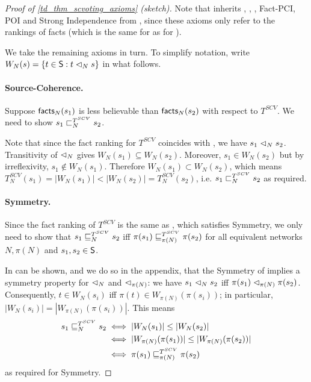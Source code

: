 \begin{proof}[Proof of \cref{td_thm_scvoting_axioms} (sketch)]

    Note that \scvoting{} inherits \unanimity{}, \groundedness{},
    \monotonicity{}, Fact-PCI,
POI and Strong Independence from \voting{}, since these axioms only refer to
the rankings of facts (which is the same for \scvoting{} as for \voting{}).

We take the remaining axioms in turn. To simplify notation, write $W_N(s) = \{t
\in \S : t \scoh_N s \}$ in what follows.

\paragraph{Source-Coherence.}

Suppose $\facts_N(s_1)$ is less believable than $\facts_N(s_2)$ with respect to
$T^{SCV}$. We need to show $s_1 \slt_N^{T^{SCV}} s_2$.

Note that since the fact ranking for $T^{SCV}$ coincides with \voting{}, we
have $s_1 \scoh_N s_2$. Transitivity of ${\scoh_N}$ gives $W_N(s_1) \subseteq
W_N(s_2)$. Moreover, $s_1 \in W_N(s_2)$ but by irreflexivity, $s_1 \notin
W_N(s_1)$. Therefore $W_N(s_1) \subset W_N(s_2)$, which means $T_N^{SCV}(s_1) =
|W_N(s_1)| < |W_N(s_2)| = T_N^{SCV}(s_2)$, i.e.  $s_1 \slt_N^{T^{SCV}} s_2$ as
required.

\paragraph{Symmetry.} Since the fact ranking of $T^{SCV}$ is the same as
\voting{}, which satisfies Symmetry, we only need to show that $s_1
\sle_N^{T^{SCV}} s_2$ iff $\pi(s_1) \sle_{\pi(N)}^{T^{SCV}} \pi(s_2)$ for all
equivalent networks $N, \pi(N)$ and $s_1, s_2 \in \S$.

In can be shown, and we do so in the appendix, that the Symmetry of \voting{}
implies a symmetry property for ${\scoh_N}$ and ${\scoh_{\pi(N)}}$: we have
$s_1 \scoh_N s_2$ iff $\pi(s_1) \scoh_{\pi(N)} \pi(s_2)$. Consequently, $t \in
W_N(s_i)$ iff $\pi(t) \in W_{\pi(N)}(\pi(s_i))$; in particular, $|W_N(s_i)| =
|W_{\pi(N)}(\pi(s_i))|$. This means
\begin{align*}
    s_1 \sle_N^{T^{SCV}} s_2
    & \iff |W_N(s_1)| \le |W_N(s_2)| \\
    & \iff |W_{\pi(N)}(\pi(s_1))| \le |W_{\pi(N)}(\pi(s_2))| \\
    & \iff \pi(s_1) \sle_{\pi(N)}^{T^{SCV}} \pi(s_2)
\end{align*}
as required for Symmetry.


\end{proof}
